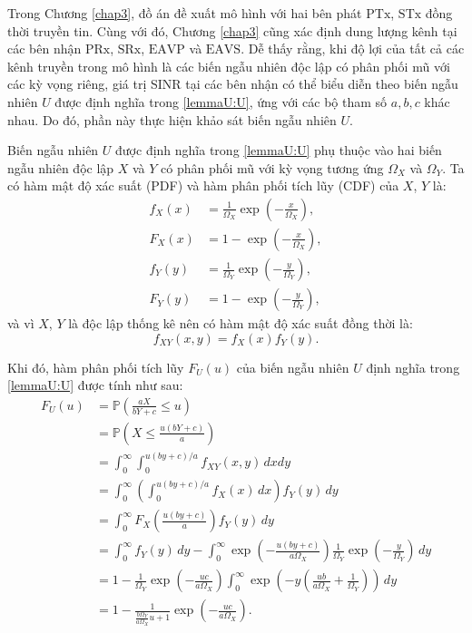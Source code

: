 \documentclass[../main.tex]{subfiles}
\begin{document}
\label{appendixA}

Trong Chương \ref{chap3}, đồ án đề xuất mô hình với hai bên phát $\text{PTx}$, $\text{STx}$ đồng thời truyền tin. Cùng với đó, Chương \ref{chap3} cũng xác định dung lượng kênh tại các bên nhận $\text{PRx}$, $\text{SRx}$, $\text{EAVP}$ và $\text{EAVS}$. Dễ thấy rằng, khi độ lợi của tất cả các kênh truyền trong mô hình là các biến ngẫu nhiên độc lập có phân phối mũ với các kỳ vọng riêng, giá trị SINR tại các bên nhận có thể biểu diễn theo biến ngẫu nhiên $U$ được định nghĩa trong \eqref{lemmaU:U}, ứng với các bộ tham số $a, b, c$ khác nhau. Do đó, phần này thực hiện khảo sát biến ngẫu nhiên $U$.

Biến ngẫu nhiên $U$ được định nghĩa trong \eqref{lemmaU:U} phụ thuộc vào hai biến ngẫu nhiên độc lập $X$ và $Y$ có phân phối mũ với kỳ vọng tương ứng $\Omega_X$ và $\Omega_Y$. Ta có hàm mật độ xác suất (PDF) và hàm phân phối tích lũy (CDF) của $X$, $Y$ là:
\begin{align*}
    f_X\left(x\right) &= \frac{1}{\Omega_X}\exp\left(-\frac{x}{\Omega_X}\right), \\
    F_X\left(x\right) &= 1-\exp\left(-\frac{x}{\Omega_X}\right), \\
    f_Y\left(y\right) &= \frac{1}{\Omega_Y}\exp\left(-\frac{y}{\Omega_Y}\right), \\
    F_Y\left(y\right) &= 1-\exp\left(-\frac{y}{\Omega_Y}\right),
\end{align*}
và vì $X$, $Y$ là độc lập thống kê nên có hàm mật độ xác suất đồng thời là:
\begin{equation*}
    f_{XY}\left(x, y\right) = f_X\left(x\right)f_Y\left(y\right).
\end{equation*}

Khi đó, hàm phân phối tích lũy $F_U(u)$ của biến ngẫu nhiên $U$ định nghĩa trong \eqref{lemmaU:U} được tính như sau:
\allowdisplaybreaks
\begin{align*}
    F_U(u) 
    &= \mathbb{P}\left(\frac{aX}{bY+c} \leq u \right) \\
    &= \mathbb{P}\left(X \leq \frac{u\left(bY+c\right)}{a} \right) \\
    &= \int_{0}^{\infty} \int_{0}^{u\left(by+c\right)/a} f_{XY}\left(x, y\right) \,dxdy \\
    &= \int_{0}^{\infty} \left( \int_{0}^{u\left(by+c\right)/a} f_{X}\left(x\right) \,dx \right) f_Y\left(y\right) \, dy \\
    &= \int_{0}^{\infty} F_X\left(\frac{u\left(by+c\right)}{a}\right) f_Y\left(y\right) \, dy \\
    &= \int_{0}^{\infty} f_Y\left(y\right) \,dy - \int_{0}^{\infty} \exp\left(-\frac{u\left(by+c\right)}{a\Omega_X}\right) \frac{1}{\Omega_Y}\exp\left(-\frac{y}{\Omega_Y}\right) \, dy \\
    &= 1 - \frac{1}{\Omega_Y}\exp\left(-\frac{uc}{a\Omega_X}\right)\int_{0}^{\infty} \exp\left(-y\left( \frac{ub}{a\Omega_X} + \frac{1}{\Omega_Y}\right)\right) \, dy \\
    &= 1 - \frac{1}{\frac{b\Omega_Y}{a\Omega_X}u + 1}\exp\left(-\frac{uc}{a\Omega_X}\right).
\end{align*}
\end{document}
